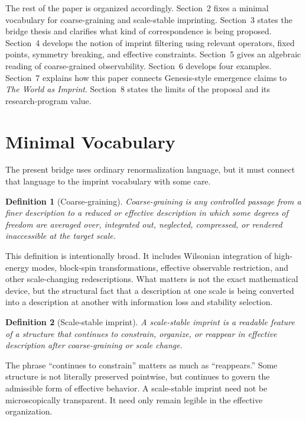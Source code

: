 \documentclass[12pt,a4paper]{article}
\newtheorem{definition}{Definition}[section]
\begin{document}
The rest of the paper is organized accordingly. Section~2 fixes a minimal vocabulary for coarse-graining and scale-stable imprinting. Section~3 states the bridge thesis and clarifies what kind of correspondence is being proposed. Section~4 develops the notion of imprint filtering using relevant operators, fixed points, symmetry breaking, and effective constraints. Section~5 gives an algebraic reading of coarse-grained observability. Section~6 develops four examples. Section~7 explains how this paper connects Genesis-style emergence claims to \emph{The World as Imprint}. Section~8 states the limits of the proposal and its research-program value.

\section{Minimal Vocabulary}

The present bridge uses ordinary renormalization language, but it must connect that language to the imprint vocabulary with some care.

\begin{definition}[Coarse-graining]
\emph{Coarse-graining} is any controlled passage from a finer description to a reduced or effective description in which some degrees of freedom are averaged over, integrated out, neglected, compressed, or rendered inaccessible at the target scale.
\end{definition}

This definition is intentionally broad. It includes Wilsonian integration of high-energy modes, block-spin transformations, effective observable restriction, and other scale-changing redescriptions. What matters is not the exact mathematical device, but the structural fact that a description at one scale is being converted into a description at another with information loss and stability selection.

\begin{definition}[Scale-stable imprint]
A \emph{scale-stable imprint} is a readable feature of a structure that continues to constrain, organize, or reappear in effective description after coarse-graining or scale change.
\end{definition}

The phrase ``continues to constrain'' matters as much as ``reappears.'' Some structure is not literally preserved pointwise, but continues to govern the admissible form of effective behavior. A scale-stable imprint need not be microscopically transparent. It need only remain legible in the effective organization.
\end{document}
